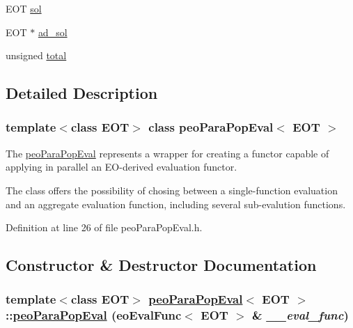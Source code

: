 \begin{CompactItemize}
\item 
\hypertarget{classpeoParaPopEval_fb6941e0455515a908eb82342b995163}{
EOT \hyperlink{classpeoParaPopEval_fb6941e0455515a908eb82342b995163}{sol}}
\label{classpeoParaPopEval_fb6941e0455515a908eb82342b995163}

\item 
\hypertarget{classpeoParaPopEval_60cafeab376262af675fdff43434c8d8}{
EOT $\ast$ \hyperlink{classpeoParaPopEval_60cafeab376262af675fdff43434c8d8}{ad\_\-sol}}
\label{classpeoParaPopEval_60cafeab376262af675fdff43434c8d8}

\item 
\hypertarget{classpeoParaPopEval_b528ad9dd9006c3dd57f149a3843e57d}{
unsigned \hyperlink{classpeoParaPopEval_b528ad9dd9006c3dd57f149a3843e57d}{total}}
\label{classpeoParaPopEval_b528ad9dd9006c3dd57f149a3843e57d}

\end{CompactItemize}


\subsection{Detailed Description}
\subsubsection*{template$<$class EOT$>$ class peo\-Para\-Pop\-Eval$<$ EOT $>$}

The \hyperlink{classpeoParaPopEval}{peo\-Para\-Pop\-Eval} represents a wrapper for creating a functor capable of applying in parallel an EO-derived evaluation functor. 

The class offers the possibility of chosing between a single-function evaluation and an aggregate evaluation function, including several sub-evalution functions. 



Definition at line 26 of file peo\-Para\-Pop\-Eval.h.

\subsection{Constructor \& Destructor Documentation}
\hypertarget{classpeoParaPopEval_bcb540510a7038520bec41a7af332daf}{
\subsubsection[peoParaPopEval]{\setlength{\rightskip}{0pt plus 5cm}template$<$class EOT$>$ \hyperlink{classpeoParaPopEval}{peo\-Para\-Pop\-Eval}$<$ EOT $>$::\hyperlink{classpeoParaPopEval}{peo\-Para\-Pop\-Eval} (eo\-Eval\-Func$<$ EOT $>$ \& {\em \_\-\_\-eval\_\-func})}}
\label{classpeoParaPopEval_bcb540510a7038520bec41a7af332daf}


